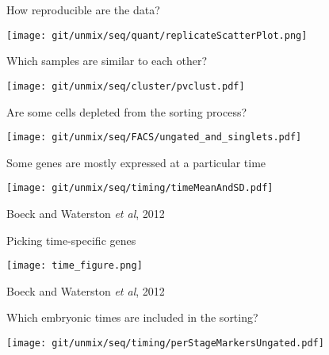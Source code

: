 \documentclass[serif,9pt]{beamer}
\begin{document}
\begin{frame}{How reproducible are the data?}

\texttt{[image: git/unmix/seq/quant/replicateScatterPlot.png]}

\end{frame}

\begin{frame}{Which samples are similar to each other?}

\texttt{[image: git/unmix/seq/cluster/pvclust.pdf]}

\end{frame}

\begin{frame}{Are some cells depleted from the sorting process?}

\texttt{[image: git/unmix/seq/FACS/ungated\_and\_singlets.pdf]}

\end{frame}


\begin{frame}{Some genes are mostly expressed at a particular time}

\texttt{[image: git/unmix/seq/timing/timeMeanAndSD.pdf]}

\hfill Boeck and Waterston {\em et al}, 2012

\end{frame}

\begin{frame}{Picking time-specific genes}

\texttt{[image: time\_figure.png]}

\hfill Boeck and Waterston {\em et al}, 2012

\end{frame}

\begin{frame}{Which embryonic times are included in the sorting?}

\texttt{[image: git/unmix/seq/timing/perStageMarkersUngated.pdf]}

\end{frame}
\end{document}
